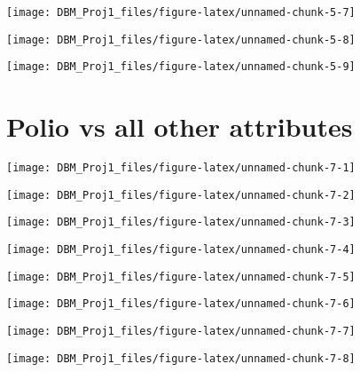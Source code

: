 \documentclass[
]{article}
\begin{document}
\begin{center}\texttt{[image: DBM\_Proj1\_files/figure-latex/unnamed-chunk-5-7]} \end{center}

\begin{center}\texttt{[image: DBM\_Proj1\_files/figure-latex/unnamed-chunk-5-8]} \end{center}

\begin{center}\texttt{[image: DBM\_Proj1\_files/figure-latex/unnamed-chunk-5-9]} \end{center}

\hypertarget{polio-vs-all-other-attributes}{%
\section{Polio vs all other
attributes}\label{polio-vs-all-other-attributes}}

\begin{center}\texttt{[image: DBM\_Proj1\_files/figure-latex/unnamed-chunk-7-1]} \end{center}

\begin{center}\texttt{[image: DBM\_Proj1\_files/figure-latex/unnamed-chunk-7-2]} \end{center}

\begin{center}\texttt{[image: DBM\_Proj1\_files/figure-latex/unnamed-chunk-7-3]} \end{center}

\begin{center}\texttt{[image: DBM\_Proj1\_files/figure-latex/unnamed-chunk-7-4]} \end{center}

\begin{center}\texttt{[image: DBM\_Proj1\_files/figure-latex/unnamed-chunk-7-5]} \end{center}

\begin{center}\texttt{[image: DBM\_Proj1\_files/figure-latex/unnamed-chunk-7-6]} \end{center}

\begin{center}\texttt{[image: DBM\_Proj1\_files/figure-latex/unnamed-chunk-7-7]} \end{center}

\begin{center}\texttt{[image: DBM\_Proj1\_files/figure-latex/unnamed-chunk-7-8]} \end{center}
\end{document}
